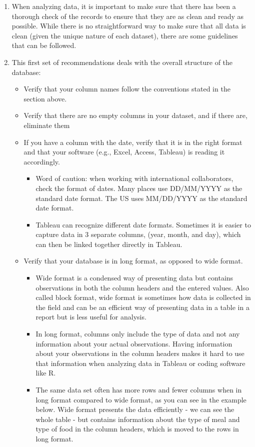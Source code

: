 \documentclass[
]{book}
\begin{document}
\begin{enumerate}
\def\labelenumi{\arabic{enumi}.}
\item
  When analyzing data, it is important to make sure that there has been a thorough check of the records to ensure that they are as clean and ready as possible. While there is no straightforward way to make sure that all data is clean (given the unique nature of each dataset), there are some guidelines that can be followed.
\item
  This first set of recommendations deals with the overall structure of the database:

  \begin{itemize}
  \item
    Verify that your column names follow the conventions stated in the section above.
  \item
    Verify that there are no empty columns in your dataset, and if there are, eliminate them
  \item
    If you have a column with the date, verify that it is in the right format and that your
    software (e.g., Excel, Access, Tableau) is reading it accordingly.

    \begin{itemize}
    \item
      Word of caution: when working with international collaborators, check the format of dates. Many places use DD/MM/YYYY as the standard date format. The US uses MM/DD/YYYY as the standard date format.
    \item
      Tableau can recognize different date formats. Sometimes it is easier to capture data in 3 separate columns, (year, month, and day), which can then be linked together directly in Tableau.
    \end{itemize}
  \item
    Verify that your database is in long format, as opposed to wide format.

    \begin{itemize}
    \item
      Wide format is a condensed way of presenting data but contains observations in both the column headers and the entered values. Also called block format, wide format is sometimes how data is collected in the field and can be an efficient way of presenting data in a table in a report but is less useful for analysis.
    \item
      In long format, columns only include the type of data and not any information about your actual observations. Having information about your observations in the column headers makes it hard to use that information when analyzing data in Tableau or coding software like R.
    \item
      The same data set often has more rows and fewer columns when in long format compared to wide format, as you can see in the example below. Wide format presents the data efficiently - we can see the whole table - but contains information about the type of meal and type of food in the column headers, which is moved to the rows in long format.
    \end{itemize}
  \end{itemize}
\end{enumerate}
\end{document}
